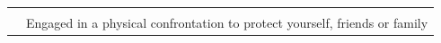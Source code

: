 \documentclass[utf8]{article}
\begin{document}
\begin{table}[]
{\begin{tabular}{ll}
                                                                                                                                                                                                                                                 &                                                                                                                                                                                                       \\
                                                                                                                                                                                                                                                 & Engaged in a physical confrontation to protect yourself, friends or family                                                                                                                           
\end{tabular}
\label{tab:14}
}
\end{table}
\clearpage



\end{document}
